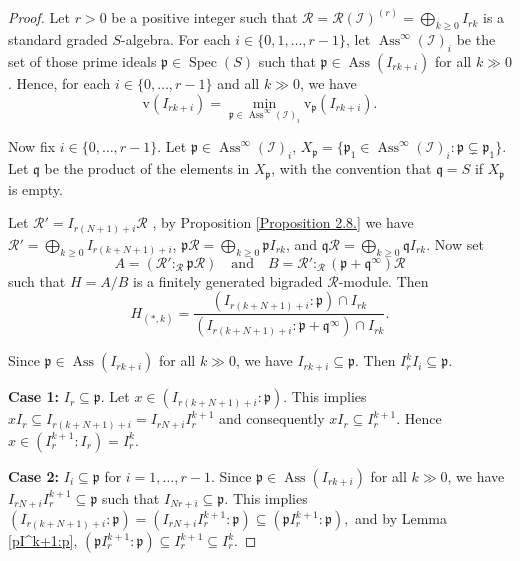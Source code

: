 \documentclass[11pt,reqno,a4paper]{amsart}
\theoremstyle{definition}
\begin{document}
\begin{proof}
Let \(r > 0\) be a positive integer such that \(\mathcal{R} = \mathcal{R}(\mathcal{I})^{(r)} = \bigoplus_{k \geq 0} I_{rk}\) is a standard graded \(S\)-algebra. For each \(i \in \{0, 1, \dots, r-1\}\), let \(\operatorname{Ass}^{\infty}(\mathcal{I})_i\) be the set of those prime ideals \(\mathfrak{p} \in \operatorname{Spec}(S)\) such that \(\mathfrak{p} \in \operatorname{Ass}(I_{rk + i})\) for all \(k \gg 0\). Hence, for each \(i \in \{0, \dots, r-1\}\) and all \(k \gg 0\), we have
\[
\mathrm{v}(I_{rk + i}) = \min_{\mathfrak{p} \in \operatorname{Ass}^{\infty}(\mathcal{I})_i} \mathrm{v}_{\mathfrak{p}}(I_{rk + i}).
\]

\noindent Now fix \(i \in \{0, \dots, r-1\}\). Let \(\mathfrak{p} \in \operatorname{Ass}^{\infty}(\mathcal{I})_i\), 
\(
X_{\mathfrak{p}} = \{ \mathfrak{p}_1 \in \operatorname{Ass}^{\infty}(\mathcal{I})_i : \mathfrak{p} \subsetneq \mathfrak{p}_1 \}.
\)
Let \(\mathfrak{q}\) be the product of the elements in \(X_{\mathfrak{p}}\), with the convention that \(\mathfrak{q} = S\) if \(X_{\mathfrak{p}}\) is empty.

\noindent Let \(\mathcal{R}' = I_{r(N+1)+i} \mathcal{R} \) , by Proposition \ref{Proposition 2.8.} we have \(\mathcal{R}' = \bigoplus_{k \geq 0} I_{r(k+N+1)+i}\), \(\mathfrak{p} \mathcal{R} = \bigoplus_{k \geq 0} \mathfrak{p} I_{rk}\), and \(\mathfrak{q} \mathcal{R} = \bigoplus_{k \geq 0} \mathfrak{q} I_{rk}\). Now set
\[
A = (\mathcal{R}' :_{\mathcal{R}} \mathfrak{p} \mathcal{R}) \quad \text{and} \quad B = \mathcal{R}' :_{\mathcal{R}} (\mathfrak{p} + \mathfrak{q}^{\infty}) \mathcal{R}
\]
such that \(H = A / B\) is a finitely generated bigraded \(\mathcal{R}\)-module. Then
\[
H_{(*,k)} = \frac{(I_{r(k+N+1)+i} : \mathfrak{p}) \cap I_{rk}}{(I_{r(k+N+1)+i} : \mathfrak{p} + \mathfrak{q}^{\infty}) \cap I_{rk}}.
\]

Since \(\mathfrak{p} \in \operatorname{Ass}(I_{rk+i})\) for all \(k \gg 0\), we have \(I_{rk+i} \subseteq \mathfrak{p}\). Then \(I_r^k I_i \subseteq \mathfrak{p}\).

\noindent \textbf{Case 1:} \(I_r \subseteq \mathfrak{p}\). Let \(x \in (I_{r(k+N+1)+i} : \mathfrak{p})\). This implies \(x I_r \subseteq I_{r(k+N+1)+i} = I_{rN+i} I_r^{k+1}\) and consequently \(x I_r \subseteq I_r^{k+1}\). Hence \(x \in (I_r^{k+1} : I_r) = I_r^k\).

\noindent \textbf{Case 2:} \(I_i \subseteq \mathfrak{p}\) for \(i = 1, \dots, r-1\). Since \(\mathfrak{p} \in \operatorname{Ass}(I_{rk+i})\) for all \(k \gg 0\), we have \(I_{rN+i} I_r^{k+1}\subseteq \mathfrak{p}\) such that \(I_{Nr+i} \subseteq \mathfrak{p}\). This implies
\(
(I_{r(k+N+1)+i} : \mathfrak{p}) = (I_{rN+i} I_r^{k+1} : \mathfrak{p}) \subseteq (\mathfrak{p} I_r^{k+1} : \mathfrak{p}),
\)
and by Lemma \ref{pI^k+1:p}, \((\mathfrak{p}I_r^{k+1} : \mathfrak{p}) \subseteq I_r^{k+1} \subseteq I_r^k\).


\end{proof}
\end{document}

